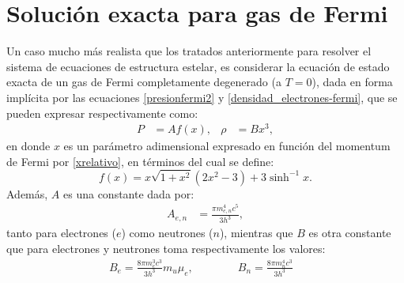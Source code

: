 \section{Solución exacta para gas de Fermi}\label{sec:fermi-exacta}

Un caso mucho más realista que los tratados anteriormente para resolver el sistema de ecuaciones de estructura estelar, es considerar la ecuación de estado exacta de un gas de Fermi completamente degenerado (a $T=0$), dada en forma implícita por las ecuaciones \eqref{presionfermi2} y \eqref{densidad_electrones-fermi}, que se pueden expresar respectivamente como:
\begin{align}\label{ec-estado-fermi}
 P&=Af(x),&\rho&=Bx^3,
\end{align}
en donde $x$ es un parámetro adimensional expresado en función del momentum de Fermi por \eqref{xrelativo}, en términos del cual se define:
\begin{equation}\label{ec-fermi-fx}
 f(x)=x\sqrt{1+x^2}\left(2x^2-3\right)+3\sinh^{-1}x.
\end{equation}
Además, $A$ es una constante dada por:
\begin{align}\label{ec-fermi-A}
 A_{e,n}&=\frac{\pi m_{e,n}^4 c^5}{3 h^3},
\end{align}
tanto para electrones ($e$) como neutrones ($n$), mientras que $B$ es otra constante que para electrones y neutrones toma respectivamente los valores:
\begin{align}\label{ec-fermi-B}
B_e=\frac{8\pi m_e^3 c^3}{3h^3}m_u\mu_e,\qquad\qquad B_n=\frac{8\pi m_n^4 c^3}{3h^3}&
\end{align}

